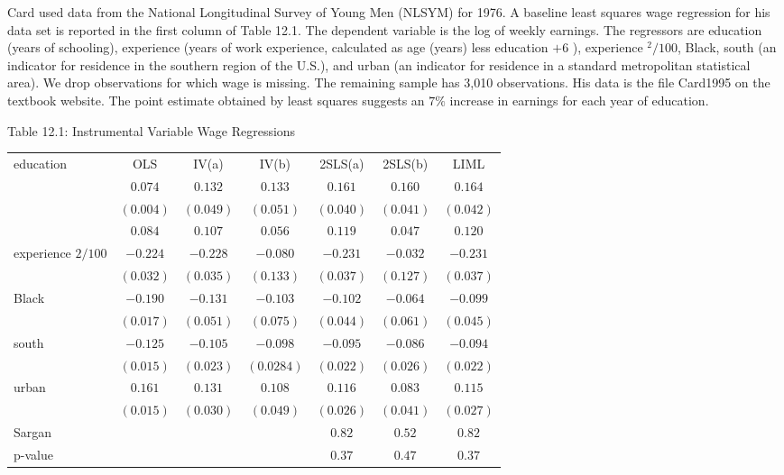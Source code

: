 \documentclass[10pt]{article}
\begin{document}
Card used data from the National Longitudinal Survey of Young Men (NLSYM) for 1976. A baseline least squares wage regression for his data set is reported in the first column of Table 12.1. The dependent variable is the log of weekly earnings. The regressors are education (years of schooling), experience (years of work experience, calculated as age (years) less education $+6$ ), experience ${ }^{2} / 100$, Black, south (an indicator for residence in the southern region of the U.S.), and urban (an indicator for residence in a standard metropolitan statistical area). We drop observations for which wage is missing. The remaining sample has 3,010 observations. His data is the file Card1995 on the textbook website. The point estimate obtained by least squares suggests an $7 \%$ increase in earnings for each year of education.

Table 12.1: Instrumental Variable Wage Regressions

\begin{tabular}{lcccccc}
\hline\hline
\multirow{3}{*}{education} & OLS & IV(a) & IV(b) & 2SLS(a) & 2SLS(b) & LIML \\
\cline { 2 - 7 }
 & $0.074$ & $0.132$ & $0.133$ & $0.161$ & $0.160$ & $0.164$ \\
 & $(0.004)$ & $(0.049)$ & $(0.051)$ & $(0.040)$ & $(0.041)$ & $(0.042)$ \\
 & $0.084$ & $0.107$ & $0.056$ & $0.119$ & $0.047$ & $0.120$ \\
experience $2 / 100$ & $-0.224$ & $-0.228$ & $-0.080$ & $-0.231$ & $-0.032$ & $-0.231$ \\
 & $(0.032)$ & $(0.035)$ & $(0.133)$ & $(0.037)$ & $(0.127)$ & $(0.037)$ \\
Black & $-0.190$ & $-0.131$ & $-0.103$ & $-0.102$ & $-0.064$ & $-0.099$ \\
 & $(0.017)$ & $(0.051)$ & $(0.075)$ & $(0.044)$ & $(0.061)$ & $(0.045)$ \\
south & $-0.125$ & $-0.105$ & $-0.098$ & $-0.095$ & $-0.086$ & $-0.094$ \\
 & $(0.015)$ & $(0.023)$ & $(0.0284)$ & $(0.022)$ & $(0.026)$ & $(0.022)$ \\
urban & $0.161$ & $0.131$ & $0.108$ & $0.116$ & $0.083$ & $0.115$ \\
 & $(0.015)$ & $(0.030)$ & $(0.049)$ & $(0.026)$ & $(0.041)$ & $(0.027)$ \\
Sargan &  &  &  & $0.82$ & $0.52$ & $0.82$ \\
p-value &  &  &  & $0.37$ & $0.47$ & $0.37$ \\
\hline
\end{tabular}
\end{document}
